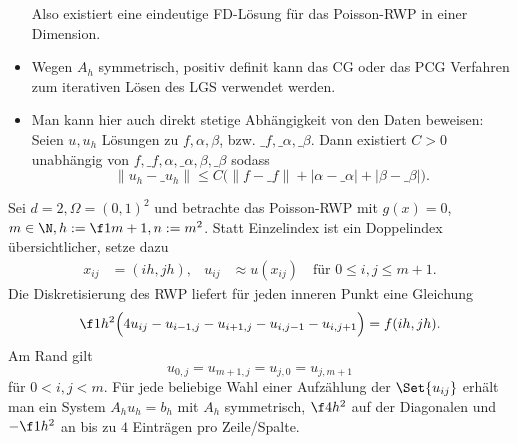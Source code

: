 \begin{ex}
\begin{note}
\begin{itemize}
				Also existiert eine eindeutige FD-Lösung für das Poisson-RWP in einer Dimension.
			\item
				Wegen $A_h$ symmetrisch, positiv definit kann das CG oder das PCG Verfahren zum iterativen Lösen des LGS verwendet werden.
			\item
				Man kann hier auch direkt stetige Abhängigkeit von den Daten beweisen:
				Seien $u, u_h$ Lösungen zu $f, \alpha, \beta$, bzw. $\_f, \_\alpha, \_\beta$.
				Dann existiert $C > 0$ unabhängig von $f, \_f, \alpha, \_\alpha, \beta, \_\beta$ sodass
				\[
					\|u_h - \_u_h\| \le C \Big( \|f-\_f\| + |\alpha - \_\alpha| + |\beta - \_\beta| \Big).
				\]
		\end{itemize}
	\end{note}
\end{ex}

\begin{ex} \label{2.9}
	Sei $d = 2, \Omega = (0,1)^2$ und betrachte das Poisson-RWP mit $g(x) = 0$, $m \in \N, h:= \f 1{m+1}, n := m^2$.
	Statt Einzelindex ist ein Doppelindex übersichtlicher, setze dazu
	\begin{align*}
		x_{ij} &= (ih, jh),&
		u_{ij} &\approx u(x_{ij}) \quad \text{für $0 \le i,j \le m+1$}.
	\end{align*}
	Die Diskretisierung des RWP liefert für jeden inneren Punkt eine Gleichung
	\[
		\f 1{h^2} \Big( 4 u_{ij} - u_{i-1,j} - u_{i+1,j} - u_{i,j-1} - u_{i,j+1}\Big)
		= f(ih, jh).
	\]
	Am Rand gilt
	\[
		u_{0,j} = u_{m+1,j} = u_{j,0} = u_{j,m+1}
	\]
	für $0 < i,j < m$.
	Für jede beliebige Wahl einer Aufzählung der $\Set{u_{ij}}$ erhält man ein System $A_h u_h = b_h$ mit $A_h$ symmetrisch, $\f 4{h^2}$ auf der Diagonalen und $-\f 1{h^2}$ an bis zu $4$ Einträgen pro Zeile/Spalte.


\end{ex}
